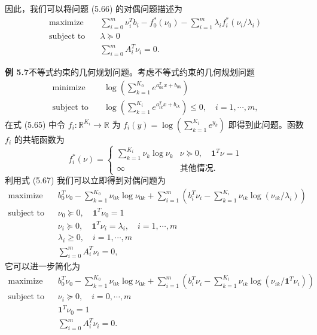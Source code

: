 \documentclass[UTF8,12pt,a4paper,fontset=fandol]{ctexart}
\begin{document}
因此，我们可以将问题 (5.66) 的对偶问题描述为
\begin{equation}
\begin{aligned}
\text{maximize}\quad & \sum_{i=0}^m\nu_i^Tb_i-f_0^\ast(\nu_0)-\sum_{i=1}^m\lambda_i f_i^\ast(\nu_i/\lambda_i)\\
\text{subject to}\quad & \lambda\succeq 0\\
& \sum_{i=0}^m A_i^T\nu_i=0.
\end{aligned}
\tag{5.67}
\end{equation}

\noindent\textbf{例 5.7}\quad 不等式约束的几何规划问题。考虑不等式约束的几何规划问题
\[
\begin{aligned}
\text{minimize}\quad & \log\left(\sum_{k=1}^{K_0}e^{a_{0k}^Tx+b_{0k}}\right)\\
\text{subject to}\quad & \log\left(\sum_{k=1}^{K_i}e^{a_{ik}^Tx+b_{ik}}\right)\leq 0,\quad i=1,\cdots,m,
\end{aligned}
\]
在式 (5.65) 中令 $f_i:\mathbb{R}^{K_i}\to\mathbb{R}$ 为 $f_i(y)=\log\left(\sum_{k=1}^{K_i}e^{y_k}\right)$ 即得到此问题。函数 $f_i$ 的共轭函数为
\[
f_i^\ast(\nu)=
\begin{cases}
\sum_{k=1}^{K_i}\nu_k\log\nu_k & \nu\succeq 0,\quad \mathbf{1}^T\nu=1\\
\infty & \text{其他情况}.
\end{cases}
\]
利用式 (5.67) 我们可以立即得到对偶问题为
\[
\begin{aligned}
\text{maximize}\quad & b_0^T\nu_0-\sum_{k=1}^{K_0}\nu_{0k}\log\nu_{0k}
+\sum_{i=1}^m\left(b_i^T\nu_i-\sum_{k=1}^{K_i}\nu_{ik}\log(\nu_{ik}/\lambda_i)\right)\\
\text{subject to}\quad & \nu_0\succeq 0,\quad \mathbf{1}^T\nu_0=1\\
& \nu_i\succeq 0,\quad \mathbf{1}^T\nu_i=\lambda_i,\quad i=1,\cdots,m\\
& \lambda_i\geq 0,\quad i=1,\cdots,m\\
& \sum_{i=0}^m A_i^T\nu_i=0,
\end{aligned}
\]
它可以进一步简化为
\[
\begin{aligned}
\text{maximize}\quad & b_0^T\nu_0-\sum_{k=1}^{K_0}\nu_{0k}\log\nu_{0k}
+\sum_{i=1}^m\left(b_i^T\nu_i-\sum_{k=1}^{K_i}\nu_{ik}\log(\nu_{ik}/\mathbf{1}^T\nu_i)\right)\\
\text{subject to}\quad & \nu_i\succeq 0,\quad i=0,\cdots,m\\
& \mathbf{1}^T\nu_0=1\\
& \sum_{i=0}^m A_i^T\nu_i=0.
\end{aligned}
\]
\end{document}

